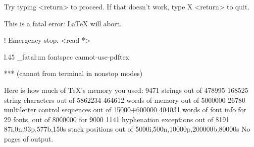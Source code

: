 Try typing <return> to proceed.
If that doesn't work, type X <return> to quit.

This is a fatal error: LaTeX will abort.



! Emergency stop.
<read *> 
         
l.45 \msg_fatal:nn {fontspec} {cannot-use-pdftex}
                                                 
*** (cannot \read from terminal in nonstop modes)

 
Here is how much of TeX's memory you used:
 9471 strings out of 478995
 168525 string characters out of 5862234
 464612 words of memory out of 5000000
 26780 multiletter control sequences out of 15000+600000
 404031 words of font info for 29 fonts, out of 8000000 for 9000
 1141 hyphenation exceptions out of 8191
 87i,0n,93p,577b,150s stack positions out of 5000i,500n,10000p,200000b,80000s
No pages of output.
